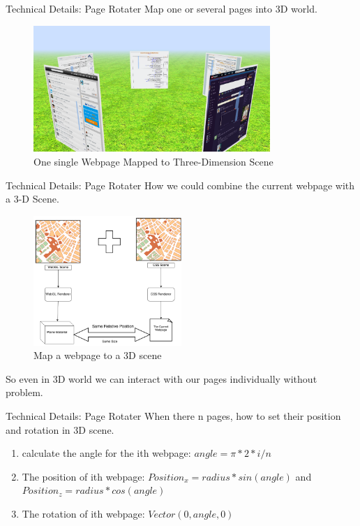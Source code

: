 \documentclass{beamer}
\begin{document}
\begin{frame}{Technical Details: Page Rotater}
Map one or several pages into 3D world.
\begin{center}
    \begin{figure}
        \includegraphics[width=0.8\textwidth]{./images/multi-3d-webpages.png}
        \caption{One single Webpage Mapped to Three-Dimension Scene}
    \end{figure}
\end{center}
\begin{center}
\end{center}
\end{frame}

\begin{frame}{Technical Details: Page Rotater}
How we could combine the current webpage with a 3-D Scene.
\begin{center}
    \begin{figure}
        \includegraphics[width=0.5\textwidth]{./images/css3d.png}
        \caption{Map a webpage to a 3D scene}
    \end{figure}
\end{center}
So even in 3D world we can interact with our pages individually without problem.
\end{frame}


\begin{frame}{Technical Details: Page Rotater}
When there n pages, how to set their position and rotation in 3D scene.
\begin{enumerate}
    \item calculate the angle for the ith webpage: $angle = \pi * 2 * i / n$
    \item The position of ith webpage: $Position_{x} = radius * sin(angle)$ and $Position_{z} = radius * cos(angle)$
    \item The rotation of ith webpage: $Vector(0, angle, 0)$
\end{enumerate}
\end{frame}
\end{document}

